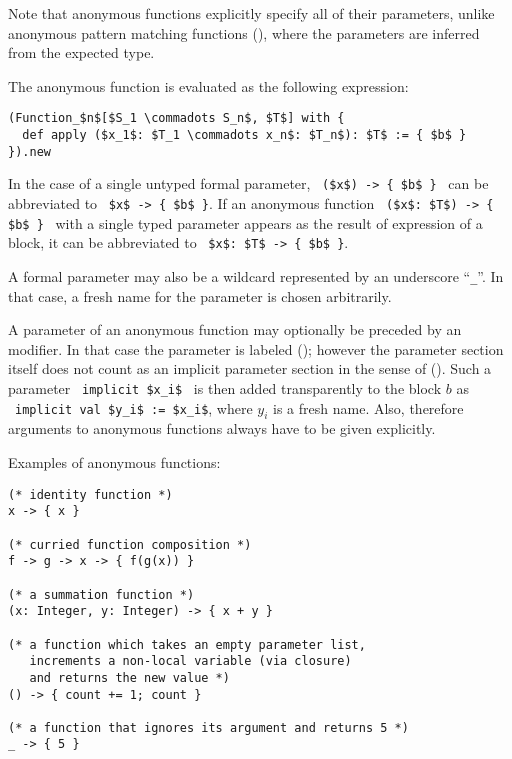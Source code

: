 Note that anonymous functions explicitly specify all of their parameters, unlike anonymous pattern matching functions (), where the parameters are inferred from the expected type. 

The anonymous function is evaluated as the following expression:
\begin{lstlisting}
(Function_$n$[$S_1 \commadots S_n$, $T$] with {
  def apply ($x_1$: $T_1 \commadots x_n$: $T_n$): $T$ := { $b$ }
}).new
\end{lstlisting}

In the case of a single untyped formal parameter, ~\lstinline!($x$) -> { $b$ }!~ can be abbreviated to ~\lstinline!$x$ -> { $b$ }!. If an anonymous function ~\lstinline!($x$: $T$) -> { $b$ }!~ with a single typed parameter appears as the result of expression of a block, it can be abbreviated to ~\lstinline!$x$: $T$ -> { $b$ }!.

A formal parameter may also be a wildcard represented by an underscore ``\lstinline!_!''. In that case, a fresh name for the parameter is chosen arbitrarily. 

A parameter of an anonymous function may optionally be preceded by an  modifier. In that case the parameter is labeled  (); however the parameter section itself does not count as an implicit parameter section in the sense of (). Such a parameter ~\lstinline!implicit $x_i$!~ is then added transparently to the block $b$ as ~\lstinline!implicit val $y_i$ := $x_i$!, where $y_i$ is a fresh name. Also, therefore arguments to anonymous functions always have to be given explicitly. 

\example Examples of anonymous functions:
\begin{lstlisting}
(* identity function *)
x -> { x }

(* curried function composition *)
f -> g -> x -> { f(g(x)) }

(* a summation function *)
(x: Integer, y: Integer) -> { x + y }

(* a function which takes an empty parameter list,
   increments a non-local variable (via closure)
   and returns the new value *)
() -> { count += 1; count }

(* a function that ignores its argument and returns 5 *)
_ -> { 5 }
\end{lstlisting}





